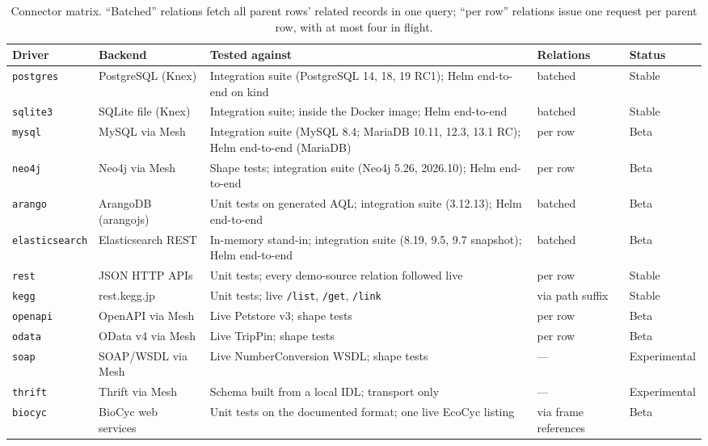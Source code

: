 \documentclass[sigconf,nonacm]{acmart}
\begin{document}
\begin{table}[t]
\caption{Connector matrix.  ``Batched'' relations fetch all parent rows'
  related records in one query; ``per row'' relations issue one request
  per parent row, with at most four in flight.}
\label{tab:connectors}
\small
\begin{tabularx}{\textwidth}{llXll}
\toprule
Driver & Backend & Tested against & Relations & Status \\
\midrule
\texttt{postgres} & PostgreSQL (Knex) & Integration suite (PostgreSQL 14, 18, 19 RC1); Helm end-to-end on kind & batched & Stable \\
\texttt{sqlite3} & SQLite file (Knex) & Integration suite; inside the Docker image; Helm end-to-end & batched & Stable \\
\texttt{mysql} & MySQL via Mesh & Integration suite (MySQL 8.4; MariaDB 10.11, 12.3, 13.1 RC); Helm end-to-end (MariaDB) & per row & Beta \\
\texttt{neo4j} & Neo4j via Mesh & Shape tests; integration suite (Neo4j 5.26, 2026.10); Helm end-to-end & per row & Beta \\
\texttt{arango} & ArangoDB (arangojs) & Unit tests on generated AQL; integration suite (3.12.13); Helm end-to-end & batched & Beta \\
\texttt{elasticsearch} & Elasticsearch REST & In-memory stand-in; integration suite (8.19, 9.5, 9.7 snapshot); Helm end-to-end & batched & Beta \\
\texttt{rest} & JSON HTTP APIs & Unit tests; every demo-source relation followed live & per row & Stable \\
\texttt{kegg} & rest.kegg.jp & Unit tests; live \texttt{/list}, \texttt{/get}, \texttt{/link} & via path suffix & Stable \\
\texttt{openapi} & OpenAPI via Mesh & Live Petstore v3; shape tests & per row & Beta \\
\texttt{odata} & OData v4 via Mesh & Live TripPin; shape tests & per row & Beta \\
\texttt{soap} & SOAP/WSDL via Mesh & Live NumberConversion WSDL; shape tests & --- & Experimental \\
\texttt{thrift} & Thrift via Mesh & Schema built from a local IDL; transport only & --- & Experimental \\
\texttt{biocyc} & BioCyc web services & Unit tests on the documented format; one live EcoCyc listing & via frame references & Beta \\
\bottomrule
\end{tabularx}
\end{table}
\end{document}
